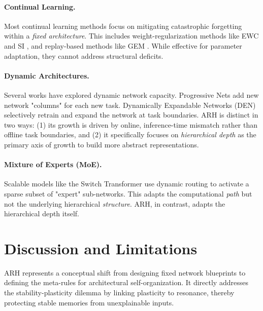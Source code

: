 \documentclass{article}
\begin{document}
\paragraph{Continual Learning.} Most continual learning methods focus on mitigating catastrophic forgetting within a \emph{fixed architecture}. This includes weight-regularization methods like EWC \citep{ewc2017} and SI \citep{si2017}, and replay-based methods like GEM \citep{gem2017}. While effective for parameter adaptation, they cannot address structural deficits.
\paragraph{Dynamic Architectures.} Several works have explored dynamic network capacity. Progressive Nets \citep{rusu2016} add new network "columns" for each new task. Dynamically Expandable Networks (DEN) \citep{den2018} selectively retrain and expand the network at task boundaries. ARH is distinct in two ways: (1) its growth is driven by online, inference-time mismatch rather than offline task boundaries, and (2) it specifically focuses on \emph{hierarchical depth} as the primary axis of growth to build more abstract representations.
\paragraph{Mixture of Experts (MoE).} Scalable models like the Switch Transformer \citep{switch2021} use dynamic routing to activate a sparse subset of "expert" sub-networks. This adapts the computational \emph{path} but not the underlying hierarchical \emph{structure}. ARH, in contrast, adapts the hierarchical depth itself.

\section{Discussion and Limitations}
ARH represents a conceptual shift from designing fixed network blueprints to defining the meta-rules for architectural self-organization. It directly addresses the stability-plasticity dilemma by linking plasticity to resonance, thereby protecting stable memories from unexplainable inputs.
\end{document}
